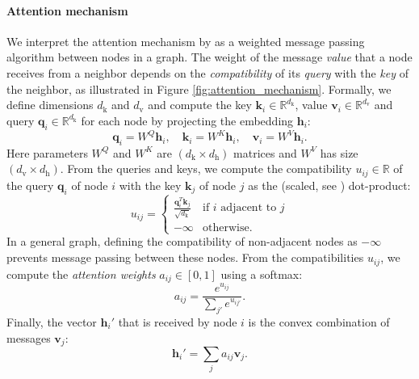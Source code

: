 \paragraph{Attention mechanism}
\label{sec:attention_mechanism}
We interpret the attention mechanism by \citet{vaswani2017attention} as a weighted message passing algorithm between nodes in a graph. The weight of the message \emph{value} that a node receives from a neighbor depends on the \emph{compatibility} of its \emph{query} with the \emph{key} of the neighbor, as illustrated in Figure \ref{fig:attention_mechanism}. Formally, we define dimensions $d_{\text{k}}$ and $d_{\text{v}}$ and compute the key $\mathbf{k}_i \in \mathbb{R}^{d_{\text{k}}}$, value $\mathbf{v}_i \in \mathbb{R}^{d_{\text{v}}}$ and query $\mathbf{q}_i \in \mathbb{R}^{d_{\text{k}}}$ for each node by projecting the embedding $\mathbf{h}_i$:
\begin{equation}
\label{eq:enc_qkv}
	\mathbf{q}_i = W^Q \mathbf{h}_i, \quad \mathbf{k}_i = W^K \mathbf{h}_i, \quad \mathbf{v}_i = W^V \mathbf{h}_i.
\end{equation}
Here parameters $W^Q$ and $W^K$ are $(d_{\text{k}} \times d_{\text{h}})$ matrices and $W^V$ has size $(d_{\text{v}} \times d_{\text{h}})$.
From the queries and keys, we compute the compatibility $u_{ij} \in \mathbb{R}$ of the query $\mathbf{q}_i$ of node $i$ with the key $\mathbf{k}_j$ of node $j$ as the (scaled, see \citet{vaswani2017attention}) dot-product:
\begin{equation}
\label{eq:compatibility}
	u_{ij} = \begin{cases}
		\frac{\mathbf{q}_i^T \mathbf{k}_j}{\sqrt{d_{\text{k}}}} & \text{if $i$ adjacent to $j$} \\
        -\infty & \text{otherwise.}
    \end{cases}
\end{equation}
In a general graph, defining the compatibility of non-adjacent nodes as $-\infty$ prevents message passing between these nodes. From the compatibilities $u_{ij}$, we compute the \emph{attention weights} $a_{ij} \in [0, 1]$ using a softmax:
\begin{equation}
	\label{eq:attention_weights}
    a_{ij} = \frac{e^{u_{ij}}}{\sum_{j'}{e^{u_{ij'}}}}.
\end{equation}
Finally, the vector $\mathbf{h}_i'$ that is received by node $i$ is the convex combination of messages $\mathbf{v}_j$:
\begin{equation}
	\label{eq:readout}
    \mathbf{h}_i' = \sum_{j} a_{ij} \mathbf{v}_j.
\end{equation}

